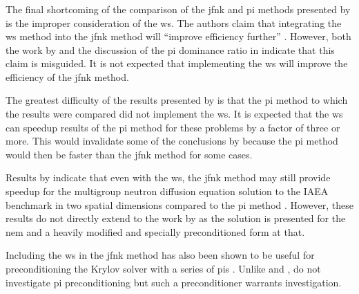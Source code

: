     \subsubsection{}
    \label{sec:wielandt_shift}

      The final shortcoming of the comparison of the \gls{jfnk} and \gls{pi}
      methods presented by \citeauthor{qe2paper} is the improper consideration
      of the \gls{ws}. The authors claim that integrating the \gls{ws} method
      into the \gls{jfnk} method will ``improve efficiency further''
      \cite{qe2paper}. However, both the work by \citeauthor{gill_azmy} and the
      discussion of the \gls{pi} dominance ratio in 
      indicate that this claim is misguided. It is not expected that
      implementing the \gls{ws} will improve the efficiency of the \gls{jfnk}
      method.

      The greatest difficulty of the results presented by \citeauthor{qe2paper}
      is that the \gls{pi} method to which the results were compared did not
      implement the \gls{ws}. It is expected that the \gls{ws} can speedup
      results of the \gls{pi} method for these problems by a factor of three or
      more. This would invalidate some of the conclusions by
      \citeauthor{qe2paper} because the \gls{pi} method would then be faster
      than the \gls{jfnk} method for some cases.

      Results by \citeauthor{jfnk_wielandt} indicate that even with the
      \gls{ws}, the \gls{jfnk} method may still provide speedup for the
      multigroup neutron diffusion equation solution to the IAEA benchmark in
      two spatial dimensions compared to the \gls{pi} method
      \cite{jfnk_wielandt}. However, these results do not directly extend to the
      work by \citeauthor{qe2paper} as the solution is presented for the
      \gls{nem} and a heavily modified and specially preconditioned form at
      that.

      Including the \gls{ws} in the \gls{jfnk} method has also been shown to be
      useful for preconditioning the Krylov solver with a series of \glspl{pi}
      \cite{jfnk_wielandt}. Unlike \citeauthor{gill_azmy} and
      \citeauthor{jfnk_wielandt}, \citeauthor{qe2paper} do not investigate
      \gls{pi} preconditioning but such a preconditioner warrants investigation.
